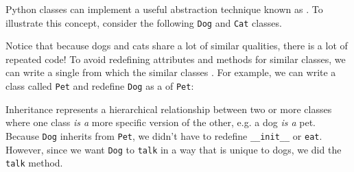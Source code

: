 Python classes can implement a useful abstraction technique known as
. To illustrate this concept, consider the following
\texttt{Dog} and \texttt{Cat} classes.



Notice that because dogs and cats share a lot of similar qualities, there is a
lot of repeated code! To avoid redefining attributes and methods for similar
classes, we can write a single  from which the similar
classes . For example, we can write a class called \texttt{Pet}
and redefine \texttt{Dog} as a  of \texttt{Pet}:



Inheritance represents a hierarchical relationship between two or more
classes where one class \textit{is a} more specific version of the other, e.g.
a dog \textit{is a} pet. Because \texttt{Dog} inherits from \texttt{Pet}, we
didn't have to redefine \texttt{\_\_init\_\_} or \texttt{eat}.  However, since
we want \texttt{Dog} to \texttt{talk} in a way that is unique to dogs, we did
 the \texttt{talk} method.
